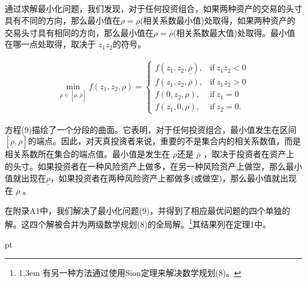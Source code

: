 \documentclass[10.0pt]{article}
\begin{document}
通过求解最小化问题，我们发现，对于任何投资组合，如果两种资产的交易的头寸具有不同的方向，那么最小值在$\rho = \underline{\rho}$(相关系数最小值)处取得，如果两种资产的交易头寸具有相同的方向，那么最小值在$\rho = \overline{\rho}$(相关系数最大值)处取得。最小值在哪一点处取得，取决于 $ z_1 z_2 $的符号。

\begin{eqnarray}
\min_{\rho \in [\underline{\rho}, \overline{\rho}]} f (z_1, z_2, \rho) 
= \left\{ \begin{matrix} 
f (z_1, z_2, \underline{\rho}), & \text{if} \ z_1 z_2 < 0 \\ 
f (z_1, z_2, \overline{\rho}), & \text{if} \ z_1 z_2 > 0 \\
f (0, z_2, \rho), & \text{if} \ z_1 = 0 \\ 
f (z_1, 0, \rho), & \text{if} \ z_2 = 0.
\end{matrix} \right.
\end{eqnarray}


方程(9)描绘了一个分段的曲面。它表明，对于任何投资组合，最小值发生在区间 $ [\underline{\rho}, \overline{\rho}] $的端点。因此，对天真投资者来说，重要的不是集合内的相关系数值，而是相关系数所在集合的端点值。最小值是发生在 $ \underline{\rho} $还是 $ \overline{\rho} $ ，取决于投资者在资产上的头寸。如果投资者在一种风险资产上做多，在另一种风险资产上做空，那么最小值就出现在$\underline{\rho}$，如果投资者在两种风险资产上都做多(或做空)，那么最小值就出现在 $ \overline{\rho} $ 。



在附录A1中，我们解决了最小化问题(9)，并得到了相应最优问题的四个单独的解。这四个解被合并为两级数学规划(8)的全局解。\footnote{\baselineskip1.3em 有另一种方法通过使用Sion定理来解决数学规划(8)。}其结果列在定理1中。


 pt
\end{document}

